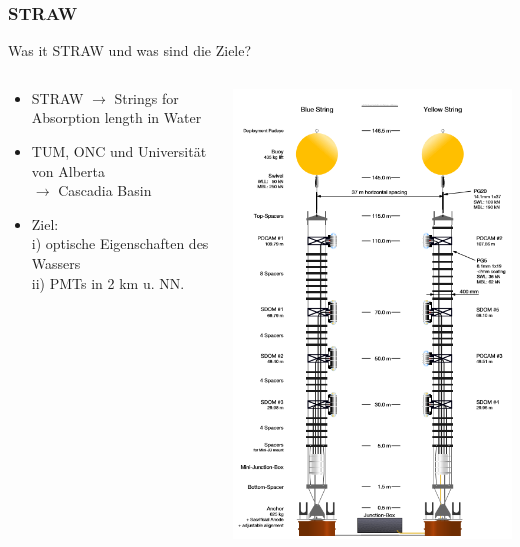 \documentclass[aspectratio=1610, 9pt]{beamer}
\begin{document}
\begin{frame}\frametitle{STRAW}
  \begin{block}{Was it STRAW und was sind die Ziele?}
    \begin{columns}
    \begin{column}[c]{0.45\textwidth}
      \begin{itemize}
        \item STRAW $\to$ Strings for Absorption length in Water
        \item TUM, ONC und Universit\"at von Alberta \\ 
        $\to$ Cascadia Basin
        \item Ziel: \\ 
        i)  optische Eigenschaften des Wassers \\
        ii) PMTs in 2 km u. NN. 
      \end{itemize}
    \end{column}
    \begin{column}[c]{0.45\textwidth}
      \includegraphics{images/straw1.png}
    \end{column}
    \end{columns}
  \end{block}
\end{frame}
\end{document}
